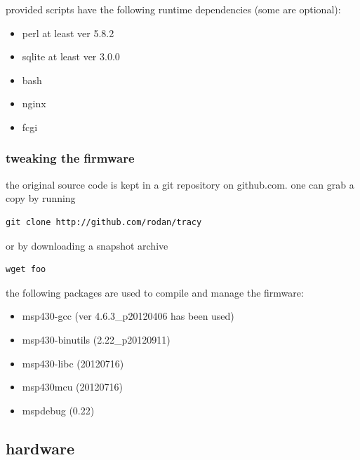 \documentclass[a4paper,twoside]{refart}
\begin{document}
provided scripts have the following runtime dependencies (some are optional):

\begin{itemize}
    \item perl at least ver 5.8.2
    \item sqlite at least ver 3.0.0
    \item bash
    \item nginx
    \item fcgi
\end{itemize}

\subsubsection{tweaking the firmware}

the original source code is kept in a git repository on github.com.
one can grab a copy by running

\begin{lstlisting}
git clone http://github.com/rodan/tracy
\end{lstlisting} 

or by downloading a snapshot archive

\begin{lstlisting}
wget foo
\end{lstlisting} 

the following packages are used to compile and manage the firmware:

\begin{itemize}
    \item msp430-gcc (ver 4.6.3\_p20120406 has been used)
    \item msp430-binutils (2.22\_p20120911)
    \item msp430-libc (20120716)
    \item msp430mcu (20120716)
    \item mspdebug (0.22)
\end{itemize}


\subsection{hardware}
\end{document}

